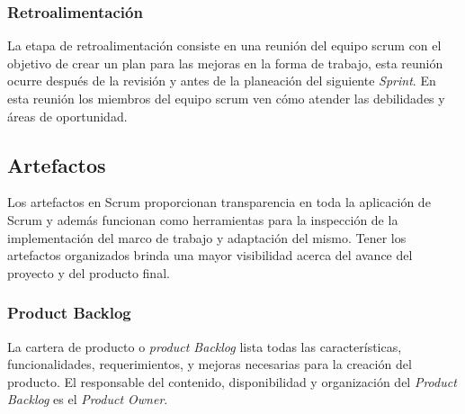 \subsubsection{Retroalimentación}

 La etapa de retroalimentación consiste en una reunión del equipo scrum con el objetivo de crear un plan para
 las mejoras en la forma de trabajo, esta reunión ocurre después de la revisión y antes de la planeación del
 siguiente {\it Sprint}. En esta reunión los miembros del equipo scrum ven cómo atender las debilidades y áreas
 de oportunidad.

\subsection{Artefactos}

 Los artefactos en Scrum proporcionan transparencia en toda la aplicación de Scrum
 y además funcionan como herramientas para la inspección de la implementación del
 marco de trabajo y adaptación del mismo. Tener los artefactos organizados brinda
 una mayor visibilidad acerca del avance del proyecto y del producto final.
 

\subsubsection{Product Backlog}

 La cartera de producto o {\it product Backlog} lista todas las características, funcionalidades, requerimientos,
 y mejoras necesarias para la creación del producto. El responsable del contenido, disponibilidad y organización
 del {\it Product Backlog} es el {\it Product Owner}.\\
       
    
    
